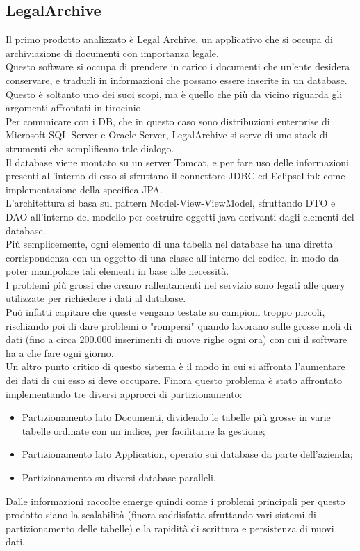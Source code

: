 \subsection{LegalArchive}
Il primo prodotto analizzato è Legal Archive, un applicativo che si occupa di archiviazione di documenti con importanza legale.\\
Questo software si occupa di prendere in carico i documenti che un'ente desidera conservare, e tradurli in informazioni che possano essere inserite in un database.\\
Questo è soltanto uno dei suoi scopi, ma è quello che più da vicino riguarda gli argomenti affrontati in tirocinio.\\
Per comunicare con i DB, che in questo caso sono distribuzioni enterprise di Microsoft SQL Server e Oracle Server, LegalArchive si serve di uno stack di strumenti che semplificano tale dialogo.\\
Il database viene montato su un server Tomcat, e per fare uso delle informazioni presenti all'interno di esso si sfruttano il connettore JDBC ed EclipseLink come implementazione della specifica JPA.\\
L'architettura si basa sul pattern Model-View-ViewModel, sfruttando DTO e DAO all'interno del modello per costruire oggetti java derivanti dagli elementi del database.\\
Più semplicemente, ogni elemento di una tabella nel database ha una diretta corrispondenza con un oggetto di una classe all'interno del codice, in modo da poter manipolare tali elementi in base alle necessità.\\
I problemi più grossi che creano rallentamenti nel servizio sono legati alle query utilizzate per richiedere i dati al database.\\
Può infatti capitare che queste vengano testate su campioni troppo piccoli, rischiando poi di dare problemi o "rompersi" quando lavorano sulle grosse moli di dati (fino a circa 200.000 inserimenti di nuove righe ogni ora) con cui il software ha a che fare ogni giorno.\\
Un altro punto critico di questo sistema è il modo in cui si affronta l'aumentare dei dati di cui esso si deve occupare. Finora questo problema è stato affrontato implementando tre diversi approcci di partizionamento:
\begin{itemize}
    \item Partizionamento lato Documenti, dividendo le tabelle più grosse in varie tabelle ordinate con un indice, per facilitarne la gestione;
    \item Partizionamento lato Application, operato sui database da parte dell'azienda;
    \item Partizionamento su diversi database paralleli.
\end{itemize}
Dalle informazioni raccolte emerge quindi come i problemi principali per questo prodotto siano la scalabilità (finora soddisfatta sfruttando vari sistemi di partizionamento delle tabelle) e la rapidità di scrittura e persistenza di nuovi dati.

